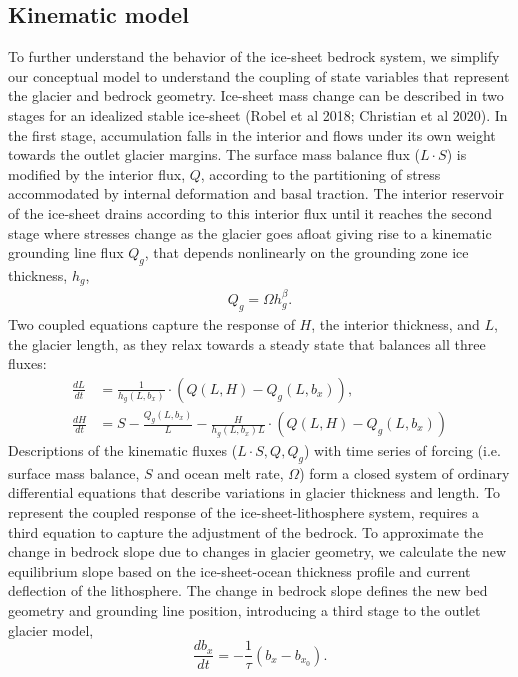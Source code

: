 \documentclass[tc, manuscript]{copernicus}
\begin{document}
\subsection{Kinematic model}

To further understand the behavior of the ice-sheet bedrock system, we simplify our conceptual model to understand the coupling of state variables that represent the glacier and bedrock geometry.
Ice-sheet mass change can be described in two stages for an idealized stable ice-sheet (Robel et al 2018; Christian et al 2020).
In the first stage, accumulation falls in the interior and flows under its own weight towards the outlet glacier margins.
The surface mass balance flux ($L\cdot S$) is modified by the interior flux, $Q$, according to the partitioning of stress accommodated by internal deformation and basal traction.
The interior reservoir of the ice-sheet drains according to this interior flux until it reaches the second stage where stresses change as the glacier goes afloat giving rise to a kinematic grounding line flux $Q_g$, that depends nonlinearly on the grounding zone ice thickness, $h_g$,
\begin{align}
Q_g=\Omega h_g^\beta.
\end{align}
 Two coupled equations capture the response of $H$, the interior thickness, and $L$, the glacier length, as they relax towards a steady state that balances all three fluxes:
 \begin{align}
\frac{dL}{dt} & = \frac{1}{h_g(L,b_x)}\cdot(Q(L,H)-Q_g(L,b_x)), \\
\frac{dH}{dt} & = S-\frac{Q_g(L,b_x)}{L}-\frac{H}{h_g(L,b_x) L} \cdot (Q(L,H)-Q_g(L,b_x))
\end{align}
Descriptions of the kinematic fluxes ($L\cdot S, Q, Q_g$) with time series of forcing (i.e. surface mass balance, $S$ and ocean melt rate, $\Omega$) form a closed system of ordinary differential equations that describe variations in glacier thickness and length. 
To represent the coupled response of the ice-sheet-lithosphere system, requires a third equation to capture the adjustment of the bedrock.
To approximate the change in bedrock slope due to changes in glacier geometry, we calculate the new equilibrium slope based on the ice-sheet-ocean thickness profile and current deflection of the lithosphere. 
The change in bedrock slope defines the new bed geometry and grounding line position, introducing a third stage to the outlet glacier model,
\begin{equation}
\frac{db_x}{dt} = -\frac{1}{\tau}(b_x - b_{x_0}).
\end{equation}
\end{document}
